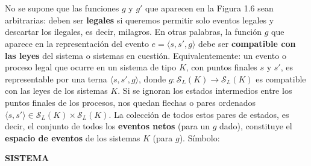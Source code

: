 {\\
\\
No se supone que las funciones $g$ y $g'$ que aparecen en la Figura 1.6 sean arbitrarias: deben ser \textbf{legales} si queremos permitir solo eventos legales y descartar los ilegales, es decir, milagros. En otras palabras, la función $g$ que aparece en la representación del evento $e = \langle s, s', g \rangle$ debe ser \textbf{compatible con las leyes} del sistema o sistemas en cuestión. Equivalentemente: un evento o proceso legal que ocurre en un sistema de tipo $K$, con puntos finales $s$ y $s'$, es representable por una terna $\langle s, s', g \rangle$, donde $g: \mathcal{S}_L(K) \rightarrow \mathcal{S}_L(K)$ es compatible con las leyes de los sistemas $K$. Si se ignoran los estados intermedios entre los puntos finales de los procesos, nos quedan flechas o pares ordenados $\langle s, s' \rangle \in \mathcal{S}_L(K) \times \mathcal{S}_L(K)$. La colección de todos estos pares de estados, es decir, el conjunto de todos los \textbf{eventos netos} (para un $g$ dado), constituye el \textbf{espacio de eventos} de los sistemas $K$ (para $g$). Símbolo:
}
\newpage
\fancyhf{}
\fancyhead[r]{\thepage}
\begin{center}
{\fontsize{16}{18}\selectfont \textbf{SISTEMA}}
\end{center}
\vspace{0.5cm}

